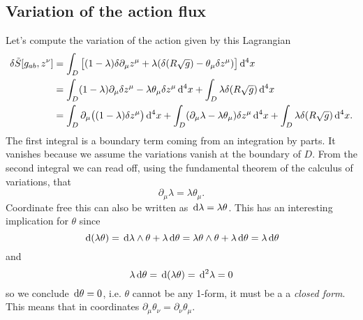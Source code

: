 \documentclass[../main.tex]{subfiles}
\begin{document}
\subsection{Variation of the action flux}
Let's compute the variation of the action given by this Lagrangian
\begin{align}
	\delta \tilde{S}[g_{ab}, z^\nu] & = \int_D \big[(1-\lambda) \delta \partial_\mu z^\mu +
	\lambda(\delta(R\sqrt{g}) - \theta_\mu \delta z^\mu)\big] \,\mathrm{d}^4 x \notag \\
																	& = \int_D (1 - \lambda) \partial_\mu \delta z^\mu -
																	\lambda \theta_\mu \delta z^\mu \,\mathrm{d}^4x + \int_D \lambda
																	\delta(R \sqrt{g}) \,\mathrm{d}^4 x \notag \\
																	& = \int_{D} \partial_\mu \big((1 -
																	\lambda)\delta z^\mu\big) \,\mathrm{d}^4 x + \int_D (\partial_\mu \lambda
																	- \lambda\theta_\mu) \delta z^\mu \,\mathrm{d}^4 x + \int_D \lambda
																	\delta(R \sqrt{g}) \,\mathrm{d}^4 x \label{eq:variation expanded
																	action}. 
\end{align}
The first integral is a boundary term coming from an integration by parts. It vanishes
because we assume the variations vanish at the boundary of \( D \). From the second
integral we can read off, using the fundamental theorem of the calculus of variations,
that
\begin{equation} \label{eq:action flux variation}
	\partial_\mu \lambda = \lambda\theta_\mu.
\end{equation}
Coordinate free this can also be written as \( \,\mathrm{d} \lambda = \lambda \theta \). This has
an interesting implication for \( \theta \) since
\begin{equation*}
	\,\mathrm{d}(\lambda \theta) = \,\mathrm{d} \lambda \wedge \theta + \lambda \,\mathrm{d} \theta = \lambda \theta
	\wedge \theta + \lambda \,\mathrm{d} \theta = \lambda \,\mathrm{d} \theta
\end{equation*}
and 
\begin{equation*}
	\lambda \,\mathrm{d} \theta = \,\mathrm{d}(\lambda \theta) = \,\mathrm{d}^2 \lambda = 0
\end{equation*}
so we conclude \( \,\mathrm{d} \theta = 0 \), i.e. \( \theta \) cannot be any 1-form, it must be a
a \emph{closed form}. This means that in coordinates \( \partial_\mu \theta_\nu =
\partial_\nu \theta_\mu \). 
\end{document}
